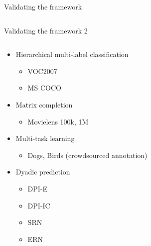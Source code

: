 \documentclass[]{beamer}
\begin{document}
\begin{frame}{Validating the framework}
\begin{columns}
\begin{column}{0.6\textwidth}
\end{column}

\end{columns}

\end{frame}


\begin{frame}{Validating the framework 2}

\begin{columns}

\begin{column}{0.4\textwidth}

\begin{itemize}
\item Hierarchical multi-label classification
\begin{itemize}
    \item VOC2007
    \item MS COCO
\end{itemize}

\item Matrix completion
\begin{itemize}
    \item Movielens 100k, 1M
\end{itemize}

\item Multi-task learning
\begin{itemize}
    \item Dogs, Birds (crowdsourced annotation)
\end{itemize}

\item Dyadic prediction
\begin{itemize}
    \item DPI-E
    \item DPI-IC
    \item SRN
    \item ERN
\end{itemize}

\end{itemize}
\end{column}

\begin{column}{0.6\textwidth}

\vspace{55mm}

\begin{table}[]
\centering
\end{table}


\end{column}
\end{columns}
\end{frame}
\end{document}
